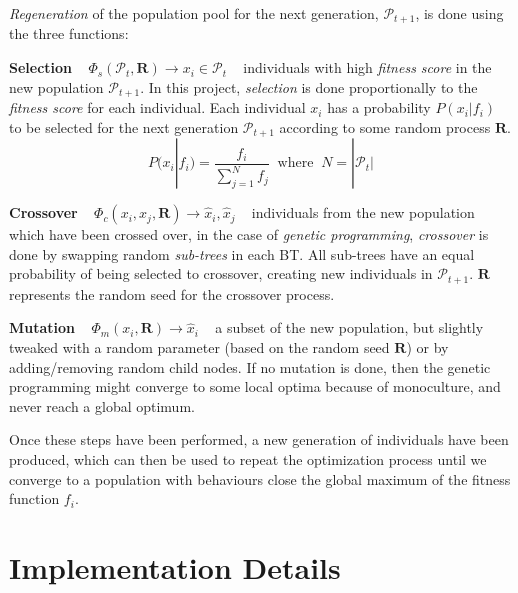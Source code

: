 \documentclass[a4paper, twocolumn]{article}
\begin{document}
	\emph{Regeneration} of the population pool for the next generation, \(\mathcal{P}_{t+1}\), is done using the three functions:

    \vspace{1em}

    \textbf{Selection} ~ \(\Phi_s(\mathcal{P}_t, \mathbf{R}) \rightarrow x_i \in \mathcal{P}_t\) ~ individuals with high \emph{fitness score} in the new population \(\mathcal{P}_{t+1}\). In this project, \emph{selection} is done proportionally to the \emph{fitness score} for each individual. Each individual \(x_i\) has a probability \(P(x_i|f_i)\) to be selected for the next generation \(\mathcal{P}_{t+1}\) according to some random process $\mathbf{R}$.
    \begin{equation*}
        P(x_i|f_i) = \frac{f_i}{\sum_{j = 1}^{N}f_j} \; \; \text{where} \; \; N = |\mathcal{P}_t|
    \end{equation*}

    \textbf{Crossover} ~ \(\Phi_c(x_i,x_j,\mathbf{R}) \rightarrow \hat{x}_i,\hat{x}_j\) ~ individuals from the new population which have been crossed over, in the case of \emph{genetic programming}, \emph{crossover} is done by swapping random \emph{sub-trees} in each BT. All sub-trees have an equal probability of being selected to crossover, creating new individuals in \(\mathcal{P}_{t+1}\). $\mathbf{R}$ represents the random seed for the crossover process.

    \vspace{1em}

    \textbf{Mutation} ~ \(\Phi_m(x_i,\mathbf{R}) \rightarrow \hat{x}_i\) ~ a subset of the new population, but slightly tweaked with a random parameter (based on the random seed $\mathbf{R}$) or by adding/removing random child nodes. If no mutation is done, then the genetic programming might converge to some local optima because of monoculture, and never reach a global optimum.

    \vspace{1em}

    Once these steps have been performed, a new generation of individuals have been produced, which can then be used to repeat the optimization process until we converge to a population with behaviours close the global maximum of the fitness function \(f_i\).


    \section{Implementation Details} \label{sec:implementation_details}
\end{document}
